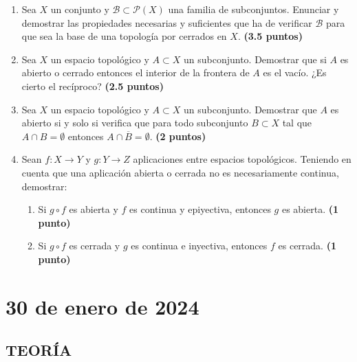 \begin{enumerate}
    \item Sea $X$ un conjunto y $\mathcal{B} \subset \mathcal{P}(X)$ una familia de subconjuntos. Enunciar y demostrar las propiedades necesarias y suficientes que ha de verificar $\mathcal{B}$ para que sea la base de una topología por cerrados en $X$.
    \hfill \textbf{(3.5 puntos)}

    \item Sea $X$ un espacio topológico y $A \subset X$ un subconjunto. Demostrar que si $A$ es abierto o cerrado entonces el interior de la frontera de $A$ es el vacío. ¿Es cierto el recíproco?
    \hfill \textbf{(2.5 puntos)}

    \item Sea $X$ un espacio topológico y $A \subset X$ un subconjunto. Demostrar que $A$ es abierto si y solo si verifica que para todo subconjunto $B \subset X$ tal que $A \cap B = \emptyset$ entonces $A \cap \overline{B} = \emptyset$.
    \hfill \textbf{(2 puntos)}

    \item Sean $f : X \to Y$ y $g : Y \to Z$ aplicaciones entre espacios topológicos. Teniendo en cuenta que una aplicación abierta o cerrada no es necesariamente continua, demostrar:
    \begin{enumerate}
        \item Si $g \circ f$ es abierta y $f$ es continua y epiyectiva, entonces $g$ es abierta.
        \hfill \textbf{(1 punto)}
        \item Si $g \circ f$ es cerrada y $g$ es continua e inyectiva, entonces $f$ es cerrada.
        \hfill \textbf{(1 punto)}
    \end{enumerate}
\end{enumerate}

\newpage

\section{30 de enero de 2024}

\subsection*{TEORÍA}


